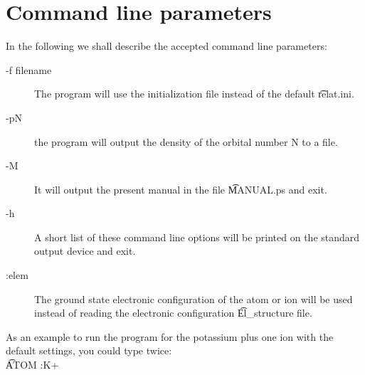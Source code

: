 \section{Command line parameters}
In the following we shall describe the accepted command line
parameters:
\begin{description}
\item[-f filename] The program will use the initialization file
 instead of the default \t{relat.ini}.
\item[-pN] the program will output the density of the orbital number N
to a file.
\item[-M] It will output the present manual in the file \t{MANUAL.ps}
and exit.
\item[-h] A short list of these command line options will be printed
on the standard output device and exit.
\item[:elem] The ground state electronic configuration of the atom or
ion  will be used instead of reading the electronic
configuration \t{El\_structure} file.
\end{description}
As an example to run the program for the potassium plus one ion with
the default settings, you could type twice:\\
\t{ATOM :K+}

